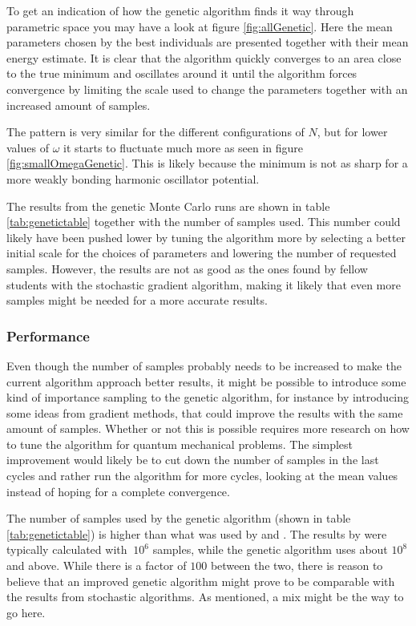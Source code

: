 \documentclass[aps,prb,twocolumn,floatfix]{revtex4}
\begin{document}
To get an indication of how the genetic algorithm finds it way through parametric space you may have a look at figure \ref{fig:allGenetic}. Here the mean parameters chosen by the best individuals are presented together with their mean energy estimate. It is clear that the algorithm quickly converges to an area close to the true minimum and oscillates around it until the algorithm forces convergence by limiting the scale used to change the parameters together with an increased amount of samples.

The pattern is very similar for the different configurations of $N$, but for lower values of $\omega$ it starts to fluctuate much more as seen in figure \ref{fig:smallOmegaGenetic}. This is likely because the minimum is not as sharp for a more weakly bonding harmonic oscillator potential.

The results from the genetic Monte Carlo runs are shown in table \ref{tab:genetictable} together with the number of samples used. This number could likely have been pushed lower by tuning the algorithm more by selecting a better initial scale for the choices of parameters and lowering the number of requested samples. However, the results are not as good as the ones found by fellow students with the stochastic gradient algorithm, making it likely that even more samples might be needed for a more accurate results.\cite{sigve,karl}

\subsubsection{Performance}

Even though the number of samples probably needs to be increased to make the current algorithm approach better results, it might be possible to introduce some kind of importance sampling to the genetic algorithm, for instance by introducing some ideas from gradient methods, that could improve the results with the same amount of samples. Whether or not this is possible requires more research on how to tune the algorithm for quantum mechanical problems. The simplest improvement would likely be to cut down the number of samples in the last cycles and rather run the algorithm for more cycles, looking at the mean values instead of hoping for a complete convergence. 

The number of samples used by the genetic algorithm (shown in table \ref{tab:genetictable}) is higher than what was used by \textcite{sigve} and \textcite{karl}. The results by \textcite{sigve} were typically calculated with $~10^6$ samples, while the genetic algorithm uses about $10^8$ and above. While there is a factor of $100$ between the two, there is reason to believe that an improved genetic algorithm might prove to be comparable with the results from stochastic algorithms. As mentioned, a mix might be the way to go here.
\end{document}
